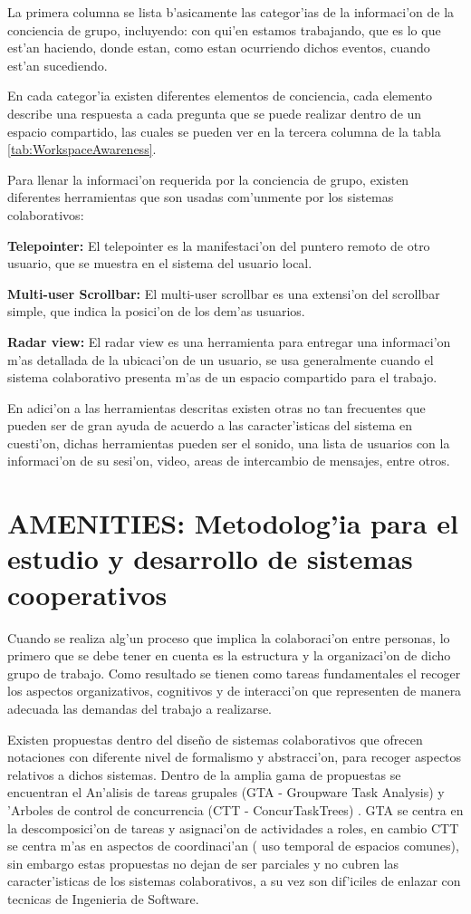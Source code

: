 \medskip
La primera columna se lista b'asicamente las categor'ias de la informaci'on de la conciencia de grupo, incluyendo: con qui'en estamos trabajando, que es lo que est'an haciendo, donde estan, como estan ocurriendo dichos eventos, cuando est'an sucediendo. 

\medskip
En cada categor'ia existen diferentes elementos de conciencia, cada elemento describe una respuesta a cada pregunta que se puede realizar dentro de un espacio compartido, las cuales se pueden ver en la tercera columna de la tabla \ref{tab:WorkspaceAwareness}. 

\medskip
Para llenar la informaci'on requerida por la conciencia de grupo, existen diferentes herramientas que son usadas com'unmente por los sistemas colaborativos:

\medskip
\textbf{Telepointer:} El telepointer es la manifestaci'on del puntero remoto de otro usuario, que se muestra en el sistema del usuario local.

\medskip
\textbf{Multi-user Scrollbar:} El multi-user scrollbar es una extensi'on del scrollbar simple, que indica la posici'on de los dem'as usuarios.

\medskip
\textbf{Radar view:} El radar view es una herramienta para entregar una informaci'on m'as detallada de la ubicaci'on de un usuario, se usa generalmente cuando el sistema colaborativo presenta m'as de un espacio compartido para el trabajo.

\medskip
En adici'on a las herramientas descritas existen otras no tan frecuentes que pueden ser de gran ayuda de acuerdo a las caracter'isticas del sistema en cuesti'on, dichas herramientas pueden ser el sonido, una lista de usuarios con la informaci'on de su sesi'on, video, areas de intercambio de mensajes, entre otros.


\section{AMENITIES: Metodolog'ia para el estudio y desarrollo de sistemas cooperativos}
Cuando se realiza alg'un proceso que implica la colaboraci'on entre personas, lo primero que se debe tener en cuenta es la estructura y la organizaci'on de dicho grupo de trabajo. Como resultado se tienen como tareas fundamentales el recoger los aspectos organizativos, cognitivos y de interacci'on que representen de manera adecuada las demandas del trabajo a realizarse.

\medskip
Existen propuestas dentro del dise\~no de sistemas colaborativos que ofrecen notaciones con diferente nivel de formalismo y abstracci'on, para recoger aspectos relativos a dichos sistemas. Dentro de la amplia gama de propuestas se encuentran el An'alisis de tareas grupales (GTA - Groupware Task Analysis) \cite{van1998ontology} y 'Arboles de control de concurrencia (CTT - ConcurTaskTrees) \cite{paterno2012model}. GTA se centra en la descomposici'on de tareas y asignaci'on de actividades a roles, en cambio CTT se centra m'as en aspectos de coordinaci'an ( uso temporal de espacios comunes), sin embargo estas propuestas no dejan de ser parciales y no cubren las caracter'isticas de los sistemas colaborativos, a su vez son dif'iciles de enlazar con tecnicas de Ingenieria de Software.

